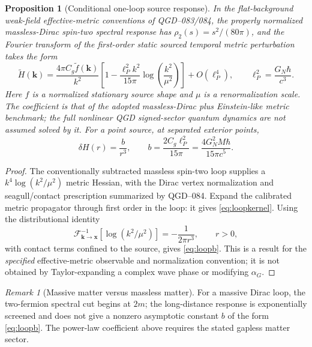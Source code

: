 \documentclass[11pt,a4paper]{article}
\newtheorem{proposition}[theorem]{Proposition}
\theoremstyle{remark}
\newtheorem{remark}[theorem]{Remark}
\begin{document}
\begin{proposition}[Conditional one-loop source response]\label{prop:diracloop}
In the flat-background weak-field effective-metric conventions of
QGD--083/084, the properly normalized massless-Dirac spin-two spectral
response has $\rho_2(s)=s^2/(80\pi)$, and the Fourier transform of the
first-order static sourced temporal metric perturbation takes the form
\begin{equation}\label{eq:loopkernel}
\boxed{\widetilde H(\mathbf k)=\frac{4\pi C_g\widetilde f(\mathbf k)}{k^2}
\left[1-\frac{\ell_P^2k^2}{15\pi}
\log\left(\frac{k^2}{\mu^2}\right)\right]
+O(\ell_P^4),\qquad \ell_P^2=\frac{G_N\hbar}{c^3}.}
\end{equation}
Here $f$ is a normalized stationary source shape and $\mu$ is a
renormalization scale. The coefficient is that of the adopted
massless-Dirac plus Einstein-like metric benchmark; the full nonlinear
QGD signed-sector quantum dynamics are not assumed solved by it.
For a point source, at separated exterior points,
\begin{equation}\label{eq:loopb}
\boxed{\delta H(r)=\frac{b}{r^3},\qquad
b=\frac{2C_g\ell_P^2}{15\pi}
=\frac{4G_N^2M\hbar}{15\pi c^5}.}
\end{equation}
\end{proposition}
\begin{proof}
The conventionally subtracted massless spin-two loop supplies a
$k^4\log(k^2/\mu^2)$ metric Hessian, with the Dirac vertex normalization
and seagull/contact prescription summarized by QGD--084.
Expand the calibrated metric propagator through first order in the loop:
it gives \eqref{eq:loopkernel}. Using the distributional identity
\begin{equation}\label{eq:fourierlog}
\mathcal F^{-1}_{\mathbf k\to\mathbf x}
\left[\log(k^2/\mu^2)\right]
=-\frac{1}{2\pi r^3},\qquad r>0,
\end{equation}
with contact terms confined to the source, gives \eqref{eq:loopb}.
This is a result for the \emph{specified} effective-metric observable and
normalization convention; it is not obtained by Taylor-expanding a
complex wave phase or modifying $\alpha_G$.
\end{proof}

\begin{remark}[Massive matter versus massless matter]
For a massive Dirac loop, the two-fermion spectral cut begins at $2m$;
the long-distance response is exponentially screened and does not give
a nonzero asymptotic constant $b$ of the form \eqref{eq:loopb}. The
power-law coefficient above requires the stated gapless matter sector.
\end{remark}
\end{document}
